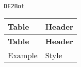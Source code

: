 \href{DE2Bot-Report.pdf}{\tt D\+E2\+Bot}

\tabulinesep=1mm
\begin{longtabu} spread 0pt [c]{*{2}{|X[-1]}|}
\hline
\rowcolor{\tableheadbgcolor}\textbf{ Table}&\textbf{ Header  }\\
\endfirsthead
\hline
\endfoot
\hline
\rowcolor{\tableheadbgcolor}\textbf{ Table}&\textbf{ Header  }\\
\endhead
Example&Style \\
\end{longtabu}
